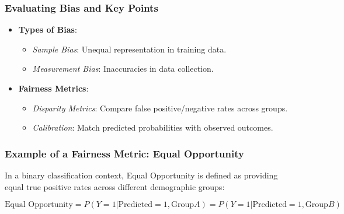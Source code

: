 \documentclass[aspectratio=169]{beamer}
\begin{document}
\begin{frame}[fragile]
    \frametitle{Evaluating Bias and Key Points}
    \begin{itemize}
        \item \textbf{Types of Bias}:
        \begin{itemize}
            \item \textit{Sample Bias}: Unequal representation in training data.
            \item \textit{Measurement Bias}: Inaccuracies in data collection.
        \end{itemize}

        \item \textbf{Fairness Metrics}:
        \begin{itemize}
            \item \textit{Disparity Metrics}: Compare false positive/negative rates across groups.
            \item \textit{Calibration}: Match predicted probabilities with observed outcomes.
        \end{itemize}
    \end{itemize}
\end{frame}

\begin{frame}[fragile]
    \frametitle{Example of a Fairness Metric: Equal Opportunity}
    In a binary classification context, Equal Opportunity is defined as providing equal true positive rates across different demographic groups:
    
    \begin{equation}
    \text{Equal Opportunity} = P(Y=1 | \text{Predicted} = 1, \text{Group} A) = P(Y=1 | \text{Predicted} = 1, \text{Group} B)
    \end{equation}
\end{frame}
\end{document}
